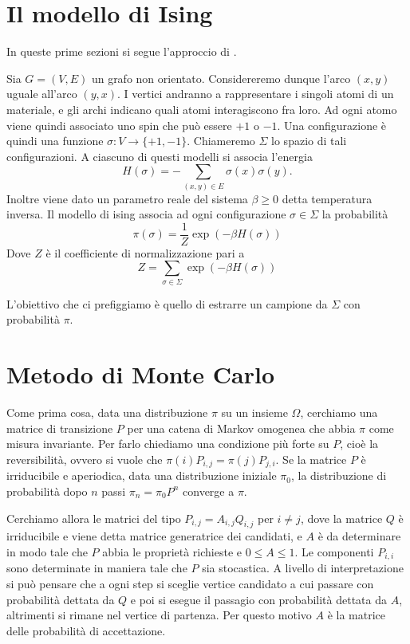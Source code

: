 \documentclass[]{marticle}
\begin{document}
\section{Il modello di Ising}
In queste prime sezioni si segue l'approccio di \cite{bremaud}.

Sia $G=(V,E)$ un grafo non orientato. Considereremo dunque l'arco $(x,y)$ uguale
all'arco $(y,x)$. I vertici andranno a rappresentare i singoli atomi di un
materiale, e gli archi indicano quali atomi interagiscono fra loro. Ad ogni
atomo viene quindi associato uno spin che pu\`o essere $+1$ o $-1$. Una
configurazione \`e quindi una funzione $\sigma\colon V \rightarrow \{+1, -1\}$.
Chiameremo $\Sigma$ lo spazio di tali configurazioni.  A ciascuno di questi
modelli si associa l'energia 
\[
    H(\sigma) = -\sum_{(x,y)\in E} \sigma(x)\sigma(y).
\]
Inoltre viene dato un parametro reale del sistema $\beta \geq 0$ detta
temperatura inversa. Il modello di ising associa ad ogni configurazione $\sigma
\in \Sigma$ la probabilit\`a
\[
    \pi(\sigma) = \frac{1}{Z} \exp(-\beta H(\sigma))
\]
Dove $Z$ \`e il coefficiente di normalizzazione pari a
\[
    Z = \sum_{\sigma \in \Sigma} \exp(-\beta H(\sigma))
\]

L'obiettivo che ci prefiggiamo \`e quello di estrarre un campione da
$\Sigma$ con probabilit\`a $\pi$.

\section{Metodo di Monte Carlo}

Come prima cosa, data una distribuzione $\pi$ su un insieme $\Omega$, cerchiamo
una matrice di transizione $P$ per una catena di Markov omogenea che abbia
$\pi$ come misura invariante. Per farlo chiediamo una condizione pi\`u forte su
$P$, cio\`e la reversibilit\`a, ovvero si vuole che $\pi (i)P_{i,j}=\pi
(j)P_{j,i}$. Se la matrice $P$ \`e irriducibile e aperiodica, data una
distribuzione iniziale $\pi_0$, la distribuzione di probabilit\`a dopo $n$ passi
$\pi_n = \pi_0 P^n$ converge a $\pi$.

Cerchiamo allora le matrici del tipo $P_{i,j} = A_{i,j} Q_{i,j}$ per $i\neq j$,
dove la matrice $Q$ \`e irriducibile e viene detta matrice generatrice dei
candidati, e $A$ \`e da determinare in modo tale che $P$ abbia le propriet\`a
richieste e $0\leq A \leq 1$. Le componenti $P_{i,i}$ sono determinate in
maniera tale che $P$ sia stocastica.  A livello di interpretazione si pu\`o
pensare che a ogni step si sceglie vertice candidato a cui passare con
probabilit\`a dettata da $Q$ e poi si esegue il passagio con probabilit\`a
dettata da $A$, altrimenti si rimane nel vertice di partenza. Per questo motivo
$A$ \`e la matrice delle probabilit\`a di accettazione. 
\end{document}
